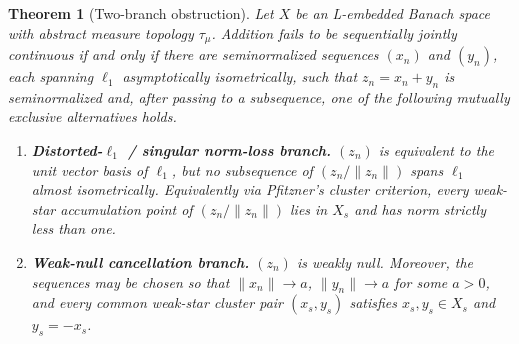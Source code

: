 \documentclass[11pt]{article}
\newtheorem{theorem}{Theorem}[section]
\theoremstyle{definition}
\theoremstyle{remark}
\newcommand{\ellone}{\ell_1}
\newcommand{\taumu}{\tau_\mu}
\begin{document}
\begin{theorem}[Two-branch obstruction]
\label{thm:obstruction}
Let $X$ be an L-embedded Banach space with abstract measure topology
$\taumu$.  Addition fails to be sequentially jointly continuous if and only
if there are seminormalized sequences $(x_n)$ and $(y_n)$, each spanning
$\ellone$ asymptotically isometrically, such that
$z_n=x_n+y_n$ is seminormalized and, after passing to a subsequence, one of
the following mutually exclusive alternatives holds.

\begin{enumerate}[label=\textup{(\Alph*)}]
\item \textbf{Distorted-$\ellone$ / singular norm-loss branch.}
$(z_n)$ is equivalent to the unit vector basis of $\ellone$, but no
subsequence of $(z_n/\|z_n\|)$ spans $\ellone$ almost isometrically.
Equivalently via Pfitzner's cluster criterion, every weak-star accumulation
point of $(z_n/\|z_n\|)$ lies in $X_s$ and has norm strictly less than one.

\item \textbf{Weak-null cancellation branch.}
$(z_n)$ is weakly null.  Moreover, the sequences may be chosen so that
$\|x_n\|\to a$, $\|y_n\|\to a$ for some $a>0$, and every common weak-star
cluster pair $(x_s,y_s)$ satisfies $x_s,y_s\in X_s$ and $y_s=-x_s$.
\end{enumerate}
\end{theorem}
\end{document}

